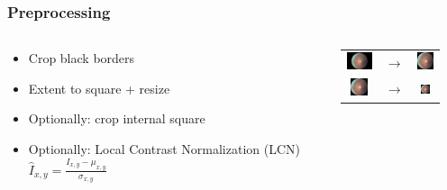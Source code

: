 \documentclass{beamer}
\begin{document}
\begin{frame}\frametitle{Preprocessing}
\begin{columns}

\begin{column}{9cm}
\begin{itemize}
\item Crop black borders
\vspace{20pt}

\item Extent to square + resize
\vspace{20pt}

\item Optionally: crop internal square
\vspace{20pt}

\item Optionally: Local Contrast Normalization (LCN) \\ 
      $ \hat{I}_{x,y} = \frac{I_{x,y} - \mu_{x,y}}{\sigma_{x,y}} $
\end{itemize}
\end{column}

\begin{column}{6cm}
\begin{tabular}{ @{}c m{0.25cm} c }

	\includegraphics[valign=c,height=0.5cm]{pics/10_left.jpeg} & $\rightarrow$ &
    \includegraphics[valign=c,height=0.5cm]{pics/10_left.png}
    \vspace{10pt} \\ 
    
	\includegraphics[valign=c,height=0.5cm]{pics/10_left.png} & $\rightarrow$ &
    \includegraphics[valign=c,height=0.25cm]{pics/10_left.png}
	\vspace{10pt} \\ 	


\end{tabular}
\end{column}
\end{columns}
\end{frame}
\end{document}
